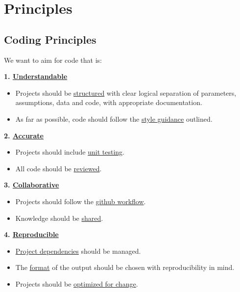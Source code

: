 \documentclass[]{book}
\providecommand{\tightlist}{%
  \setlength{\itemsep}{0pt}\setlength{\parskip}{0pt}}
\begin{document}
\hypertarget{part-principles}{%
\part{Principles}\label{part-principles}}

\hypertarget{principles}{%
\chapter*{Coding Principles}\label{principles}}

We want to aim for code that is:

\textbf{1. \protect\hyperlink{understand}{Understandable}}

\begin{itemize}
\tightlist
\item
  Projects should be \protect\hyperlink{structure2}{structured} with clear logical separation of parameters, assumptions, data and code, with appropriate documentation.\\
\item
  As far as possible, code should follow the \protect\hyperlink{style}{style guidance} outlined.
\end{itemize}

\textbf{2. \protect\hyperlink{accurate}{Accurate}}

\begin{itemize}
\tightlist
\item
  Projects should include \protect\hyperlink{unittest}{unit testing}.
\item
  All code should be \protect\hyperlink{review}{reviewed}.
\end{itemize}

\textbf{3. \protect\hyperlink{collaborate}{Collaborative}}

\begin{itemize}
\tightlist
\item
  Projects should follow the \protect\hyperlink{versioncontrol}{github workflow}.
\item
  Knowledge should be \protect\hyperlink{knowledge}{shared}.
\end{itemize}

\textbf{4. \protect\hyperlink{reproduce}{Reproducible}}

\begin{itemize}
\tightlist
\item
  \protect\hyperlink{projdep}{Project dependencies} should be managed.
\item
  The \protect\hyperlink{format}{format} of the output should be chosen with reproducibility in mind.
\item
  Projects should be \protect\hyperlink{change}{optimized for change}.
\end{itemize}
\end{document}
